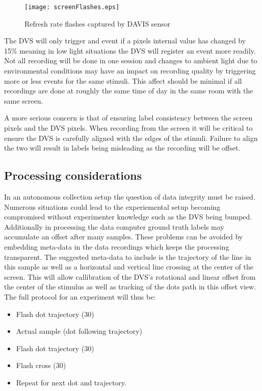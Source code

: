 \begin{figure}
    \centering
    \texttt{[image: screenFlashes.eps]}
    \caption{Refresh rate flashes captured by DAVIS sensor}
    \label{fig:refreshFlashes}
\end{figure}

The DVS will only trigger and event if a pixels internal value has changed by 15\% meaning in low light situations the DVS will register an event more readily. 
Not all recording will be done in one session and changes to ambient light due to environmental conditions may have an impact on recording quality by triggering more or less events for the same stimuli.
This affect should be minimal if all recordings are done at roughly the same time of day in the same room with the same screen. 

A more serious concern is that of ensuring label consistency between the screen pixels and the DVS pixels. 
When recording from the screen it will be critical to ensure the DVS is carefully aligned with the edges of the stimuli.
Failure to align the two will result in labels being misleading as the recording will be offset.

\subsection{Processing considerations}
In an autonomous collection setup the question of data integrity must be raised.
Numerous situations could lead to the experiemental setup becoming compromised without experimenter knowledge such as the DVS being bumped.
Additionally in processing the data computer ground truth labels may accumulate an offset after many samples.
These problems can be avoided by embedding meta-data in the data recordings which keeps the processing transparent. 
The suggested meta-data to include is the trajectory of the line in this sample as well as a horizontal and vertical line crossing at the center of the screen.
This will allow callibration of the DVS's rotational and linear offset from the center of the stimulus as well as tracking of the dots path in this offset view. 
The full protocol for an experiment will thus be:

\begin{itemize}
    \itemsep-0.5em
    \item Flash dot trajectory (30\ms)
    \item Actual sample (dot following trajectory)
    \item Flash dot trajectory (30\ms)
    \item Flash cross (30\ms)
    \item Repeat for next dot and trajectory.
\end{itemize}

